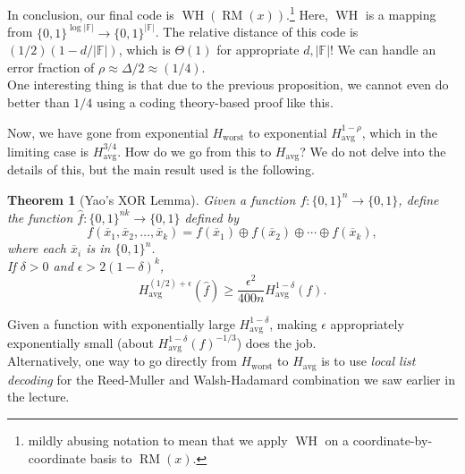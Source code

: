 \documentclass{article}
\newcounter{lecnum}
\newtheorem{theorem}{Theorem}[lecnum]
\newcommand{\BPP}{\mathsf{BPP}}
\newcommand{\PP}{\mathsf{P}}
\newcommand{\avg}{\text{avg}}
\newcommand{\worst}{\text{worst}}
\newcommand{\WH}{\operatorname{WH}}
\newcommand{\RM}{\operatorname{RM}}
\newcommand{\F}{\mathbb{F}}
\begin{document}
	In conclusion, our final code is $\WH(\RM(x))$.\footnote{mildly abusing notation to mean that we apply $\WH$ on a coordinate-by-coordinate basis to $\RM(x)$.} Here, $\WH$ is a mapping from $\{0,1\}^{\log|\F|} \to \{0,1\}^{|\F|}$. The relative distance of this code is $(1/2)(1 - d/|\F|)$, which is $\Theta(1)$ for appropriate $d,|\F|$! We can handle an error fraction of $\rho \approx \Delta/2 \approx (1/4)$.\\
	One interesting thing is that due to the previous proposition, we cannot even do better than $1/4$ using a coding theory-based proof like this.

	Now, we have gone from exponential $H_\worst$ to exponential $H_\avg^{1-\rho}$, which in the limiting case is $H_\avg^{3/4}$. How do we go from this to $H_\avg$? We do not delve into the details of this, but the main result used is the following.

	\begin{theorem}[Yao's XOR Lemma]
		Given a function $f : \{0,1\}^n \to \{0,1\}$, define the function $\hat{f} : \{0,1\}^{nk} \to \{0,1\}$ defined by
		\[ f(\overline{x}_1 , \overline{x}_2 , \ldots , \overline{x}_k) = f(\overline{x}_1) \oplus f(\overline{x}_2) \oplus \cdots \oplus f(\overline{x}_k), \]
		where each $\overline{x}_i$ is in $\{0,1\}^n$.\\
		If $\delta > 0$ and $\epsilon > 2(1-\delta)^k$,
		\[ H_\avg^{(1/2) + \epsilon} (\hat{f}) \ge \frac{\epsilon^2}{400n} H_\avg^{1-\delta}(f). \]
	\end{theorem}
	Given a function with exponentially large $H_\avg^{1-\delta}$, making $\epsilon$ appropriately exponentially small (about $H_\avg^{1-\delta}(f)^{-1/3}$) does the job.\\
	Alternatively, one way to go directly from $H_\worst$ to $H_\avg$ is to use \emph{local list decoding} for the Reed-Muller and Walsh-Hadamard combination we saw earlier in the lecture.\\

\end{document}

